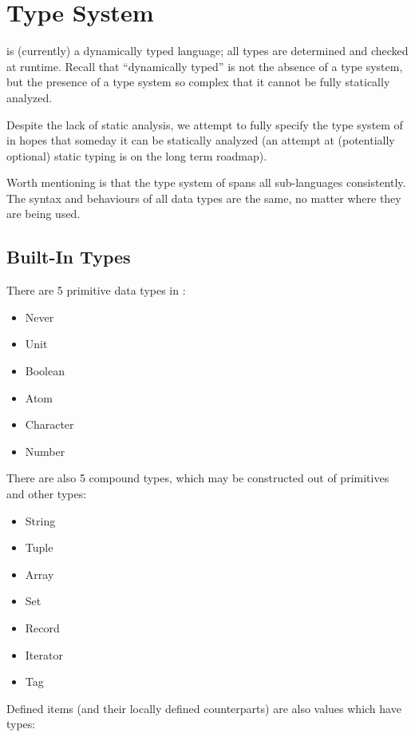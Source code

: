 \section{Type System}

\Trilogy{} is (currently) a dynamically typed language; all types are determined
and checked at runtime. Recall that ``dynamically typed'' is not the absence of
a type system, but the presence of a type system so complex that it cannot be
fully statically analyzed.

Despite the lack of static analysis, we attempt to fully specify the type system
of \Trilogy{} in hopes that someday it can be statically analyzed (an attempt at
(potentially optional) static typing is on the long term roadmap).

Worth mentioning is that the type system of \Trilogy{} spans all sub-languages
consistently. The syntax and behaviours of all data types are the same, no matter
where they are being used.

\subsection{Built-In Types}

There are 5 primitive data types in \Trilogy{}:

\begin{itemize}
    \item Never
    \item Unit
    \item Boolean
    \item Atom
    \item Character
    \item Number
\end{itemize}

\noindent
There are also 5 compound types, which may be constructed out of primitives
and other types:

\begin{itemize}
    \item String
    \item Tuple
    \item Array
    \item Set
    \item Record
    \item Iterator
    \item Tag
\end{itemize}

\noindent
Defined items (and their locally defined counterparts) are also values which
have types:

